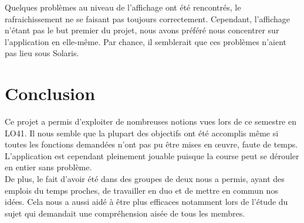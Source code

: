 \documentclass[a4paper, 11pt]{report}
\begin{document}
	Quelques problèmes au niveau de l'affichage ont été rencontrés, le rafraichissement ne se faisant pas toujours correctement. Cependant, l'affichage n'étant pas le but premier du projet, nous avons préféré nous concentrer sur l'application en elle-même. Par chance, il semblerait que ces problèmes n'aient pas lieu sous Solaris.				
	
	\chapter*{Conclusion}
	
	Ce projet a permis d'exploiter de nombreuses notions vues lors de ce semestre en LO41. Il nous semble que la plupart des objectifs ont été accomplis même si toutes les fonctions demandées n'ont pas pu être mises en œuvre, faute de temps. L'application est cependant pleinement jouable puisque la course peut se dérouler en entier sans problème. \\
	De plus, le fait d'avoir été dans des groupes de deux nous a permis, ayant des emplois du temps proches, de travailler en duo et de mettre en commun nos idées. Cela nous a aussi aidé à être plus efficaces notamment lors de l'étude du sujet qui demandait une compréhension aisée de tous les membres.
	

		
	\newpage	
		
	\tableofcontents
		
\end{document}
